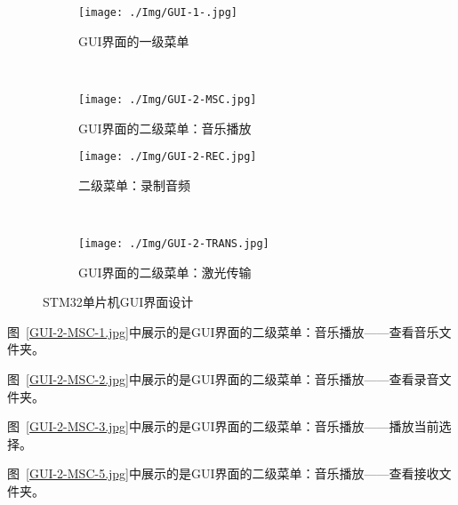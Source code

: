 \begin{figure}[!htbp] 	
	\centering
		\begin{subfigure}[c]{0.4\textwidth}
		\texttt{[image: ./Img/GUI-1-.jpg]}
		\caption{GUI界面的一级菜单}
		\label{GUI-1-.jpg}
	\end{subfigure}%
	~
	\begin{subfigure}[c]{0.4\textwidth}
		\texttt{[image: ./Img/GUI-2-MSC.jpg]}
		\caption{GUI界面的二级菜单：音乐播放}
		\label{GUI-2-MSC.jpg}
	\end{subfigure}%

	\begin{subfigure}[c]{0.4\textwidth}
		\texttt{[image: ./Img/GUI-2-REC.jpg]}
		\caption{二级菜单：录制音频}
		\label{GUI-2-REC.jpg}
	\end{subfigure}
	~
	\begin{subfigure}[c]{0.4\textwidth}
	\texttt{[image: ./Img/GUI-2-TRANS.jpg]}
	\caption{GUI界面的二级菜单：激光传输}
	\label{GUI-2-TRANS.jpg}
	\end{subfigure}
	\caption{STM32单片机GUI界面设计}
\end{figure}


图~\ref{GUI-2-MSC-1.jpg}中展示的是GUI界面的二级菜单：音乐播放——查看音乐文件夹。


图~\ref{GUI-2-MSC-2.jpg}中展示的是GUI界面的二级菜单：音乐播放——查看录音文件夹。


图~\ref{GUI-2-MSC-3.jpg}中展示的是GUI界面的二级菜单：音乐播放——播放当前选择。

图~\ref{GUI-2-MSC-5.jpg}中展示的是GUI界面的二级菜单：音乐播放——查看接收文件夹。

